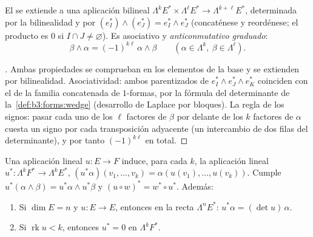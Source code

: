 \begin{definition}\label{def:b3:forms:wedgegeneral}
El  se extiende a una
aplicación bilineal $\Lambda^kE^* \times \Lambda^\ell E^* \to
\Lambda^{k+\ell}E^*$, determinada por la bilinealidad y por
$(e_I^*) \wedge (e_J^*) = e_I^* \wedge e_J^*$ (concaténese y reordénese;
el producto es $0$ si $I \cap J \neq
\varnothing$). Es asociativo y \emph{anticonmutativo graduado}:
\[
\beta \wedge \alpha = (-1)^{k\ell}\,\alpha \wedge \beta
\qquad (\alpha \in \Lambda^k, \ \beta \in \Lambda^\ell).
\]
\end{definition}

\begin{proof}[\omnameProof]
Ambas propiedades se comprueban en los elementos de la base y se
extienden por bilinealidad. Asociatividad: ambos parentizados de
$e_I^* \wedge e_J^* \wedge e_K^*$ coinciden con el  de
la familia concatenada de $1$-formas, por la fórmula del determinante de
la~\cref{def:b3:forms:wedge} (desarrollo de Laplace por bloques). La
regla de los signos: pasar cada uno de los $\ell$ factores de $\beta$
por delante de los $k$ factores de $\alpha$ cuesta un signo por cada
transposición adyacente (un intercambio de dos filas del determinante),
y por tanto $(-1)^{k\ell}$ en total.
\end{proof}

\begin{proposition}
\label{prop:b3:forms:linearpullback}
Una aplicación lineal $u\colon E \to F$ induce, para cada $k$, la
aplicación lineal $u^*\colon \Lambda^kF^* \to \Lambda^kE^*$,
$(u^*\alpha)(v_1, \dots, v_k) = \alpha(u(v_1), \dots,
u(v_k))$. Cumple $u^*(\alpha \wedge \beta) = u^*\alpha
\wedge u^*\beta$ y $(u \circ w)^* = w^* \circ u^*$. Además:
\begin{enumerate}
  \item Si $\dim E = n$ y $u\colon E \to E$, entonces en la recta
  $\Lambda^nE^*$: $u^*\alpha = (\det u)\,\alpha$. \item Si
  $\operatorname{rk}u < k$, entonces $u^* = 0$ en
        $\Lambda^kF^*$.
\end{enumerate}
\end{proposition}

